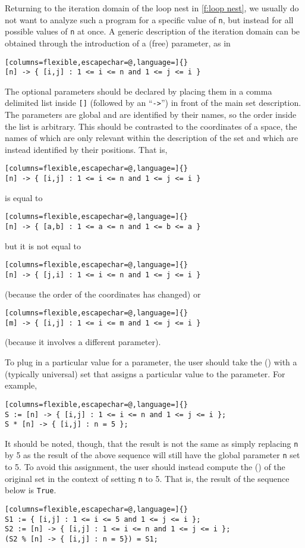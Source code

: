 Returning to the iteration domain of the loop nest
in \autoref{f:loop nest}, we usually do not want to analyze
such a program for a specific value of \lstinline{n},
but instead for all possible values of \lstinline{n} at once.
A generic description of the iteration domain can be obtained
through the introduction of a (free) parameter, as in
\begin{lstlisting}[columns=flexible,escapechar=@,language=]{}
[n] -> { [i,j] : 1 <= i <= n and 1 <= j <= i }
\end{lstlisting}
The optional parameters should
be declared by placing them in a comma delimited list inside \lstinline![]!
(followed by an ``\lstinline!->!'') in front of the main set description.
The parameters are global and are identified by their names,
so the order inside the list is arbitrary.
This should be contrasted to the coordinates of a space, the names of
which are only relevant within the description of the set and which
are instead identified by their positions.
That is,
\begin{lstlisting}[columns=flexible,escapechar=@,language=]{}
[n] -> { [i,j] : 1 <= i <= n and 1 <= j <= i }
\end{lstlisting}
is equal to
\begin{lstlisting}[columns=flexible,escapechar=@,language=]{}
[n] -> { [a,b] : 1 <= a <= n and 1 <= b <= a }
\end{lstlisting}
but it is not equal to
\begin{lstlisting}[columns=flexible,escapechar=@,language=]{}
[n] -> { [j,i] : 1 <= i <= n and 1 <= j <= i }
\end{lstlisting}
(because the order of the coordinates has changed)
or
\begin{lstlisting}[columns=flexible,escapechar=@,language=]{}
[m] -> { [i,j] : 1 <= i <= m and 1 <= j <= i }
\end{lstlisting}
(because it involves a different parameter).

To plug in a particular value for a parameter, the user should
take the  (\ai[\tt]{*}) with a (typically universal) set that
assigns a particular value to the parameter.
For example,
\begin{lstlisting}[columns=flexible,escapechar=@,language=]{}
S := [n] -> { [i,j] : 1 <= i <= n and 1 <= j <= i };
S * [n] -> { [i,j] : n = 5 };
\end{lstlisting}
It should be noted, though, that the result is not the same
as simply replacing \lstinline{n} by 5 as the result of the above
sequence will still have the global parameter \lstinline{n} set to 5.
To avoid this assignment, the user should instead compute
the  (\ai[\tt]{\%}) of the original set in the context
of setting \lstinline{n} to 5.
That is, the result of the sequence below is \lstinline{True}.
\begin{lstlisting}[columns=flexible,escapechar=@,language=]{}
S1 := { [i,j] : 1 <= i <= 5 and 1 <= j <= i };
S2 := [n] -> { [i,j] : 1 <= i <= n and 1 <= j <= i };
(S2 % [n] -> { [i,j] : n = 5}) = S1;
\end{lstlisting}

